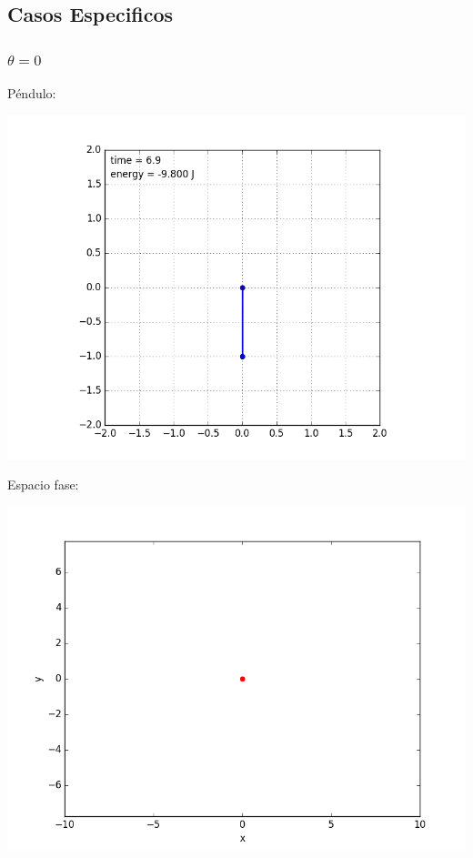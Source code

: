 \documentclass[12pt,letterpaper]{article}
\begin{document}
\subsection*{Casos Especificos}

\subsubsection*{$\theta = 0$}
Péndulo:
\begin{center}
\includegraphics[scale=0.3]{0.png}
\end{center}
Espacio fase:
\begin{center}
\includegraphics[scale=0.3]{01.png}
\end{center}
\end{document}
